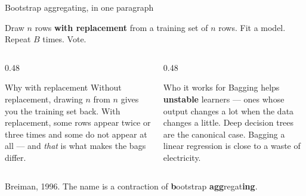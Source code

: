 \documentclass[aspectratio=169]{beamer}
\begin{document}
\begin{frame}[shrink=7]{Bootstrap aggregating, in one paragraph}
  \begin{exampleblock}{}
    \centering
    Draw $n$ rows \textbf{with replacement} from a training set of $n$ rows.
    Fit a model. Repeat $B$ times. Vote.
  \end{exampleblock}
  \begin{columns}[T]
    \begin{column}{0.48\textwidth}
      \begin{block}{Why with replacement}
        Without replacement, drawing $n$ from $n$ gives you the training set
        back. With replacement, some rows appear twice or three times and
        some do not appear at all --- and \emph{that} is what makes the bags
        differ.
      \end{block}
    \end{column}
    \begin{column}{0.48\textwidth}
      \begin{alertblock}{Who it works for}
        Bagging helps \textbf{unstable} learners --- ones whose output changes
        a lot when the data changes a little. Deep decision trees are the
        canonical case. Bagging a linear regression is close to a waste of
        electricity.
      \end{alertblock}
    \end{column}
  \end{columns}
  \begin{center}\small
    Breiman, 1996. The name is a contraction of \textbf{b}ootstrap
    \textbf{agg}regat\textbf{ing}.
  \end{center}
\end{frame}
\end{document}
